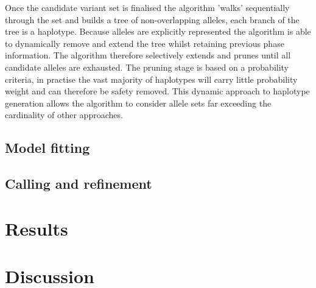 \documentclass[notitlepage]{report}
\begin{document}
Once the candidate variant set is finalised the algorithm 'walks' sequentially through the set and builds a tree of non-overlapping alleles, each branch of the tree is a haplotype. Because alleles are explicitly represented the algorithm is able to dynamically remove and extend the tree whilst retaining previous phase information. The algorithm therefore selectively extends and prunes until all candidate alleles are exhausted. The pruning stage is based on a probability criteria, in practise the vast majority of haplotypes will carry little probability weight and can therefore be safety removed. This dynamic approach to haplotype generation allows the algorithm to consider allele sets far exceeding the cardinality of other approaches.

\subsection{Model fitting}

\subsection{Calling and refinement}

\section*{Results}

\section*{Discussion}
\end{document}
